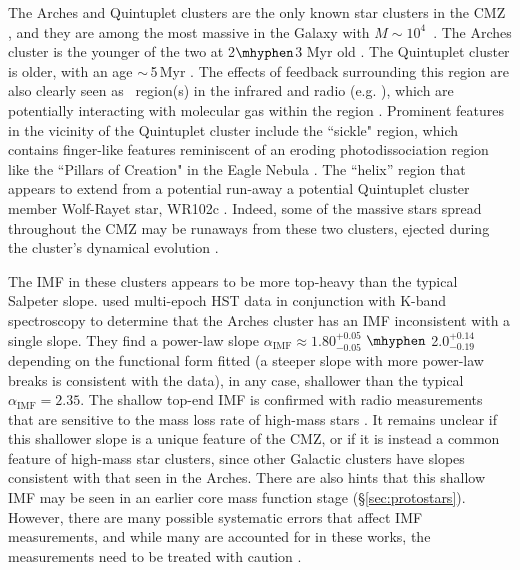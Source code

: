 The Arches and Quintuplet clusters are the only known star clusters in the CMZ
\citep[we leave out the Young Nuclear Cluster, YNC, as it is at $R<10$ pc and its formation mechanism is likely entirely different from these clusters, see e.g.][]{Genzel2010, Neumayer2020},
and they are among the most massive in the Galaxy with $M\sim10^4$~\msun.
The Arches cluster is the younger of the two at 2$\mhyphen$3 Myr old \citep{Lohr2018, Clark2019}.
The Quintuplet cluster is older, with an age $\sim$\,5\,Myr \citep{Liermann2012,Schneider2014,Rui2019}.
The effects of feedback surrounding this region are also clearly seen as \hii\ region(s) in the infrared and radio (e.g. \citealp{Lang2005,Hankins2020}), which are potentially interacting with molecular gas within the region \citep{Butterfield2018}.
Prominent features in the vicinity of the Quintuplet cluster include the ``sickle" region, which contains finger-like features reminiscent of an eroding photodissociation region like the ``Pillars of Creation" in the Eagle Nebula \citep{Hankins2020}. 
The ``helix” region that appears to extend from a potential run-away a potential Quintuplet cluster member Wolf-Rayet star, WR102c \citep{Lau2016,Steinke2016}. 
Indeed, some of the massive stars spread throughout the CMZ may be runaways from these two clusters, ejected during the cluster's dynamical evolution \citep{Habibi2014,Dong2015}.

The IMF in these clusters appears to be more top-heavy than the typical Salpeter slope.
\citet{Hosek2019} used multi-epoch HST data in conjunction with K-band spectroscopy to determine that the Arches cluster has an IMF inconsistent with a single slope.
They find a power-law slope $\alpha_\mathrm{IMF}\approx1.80^{+0.05}_{-0.05}$ $\mhyphen$ 2.0$^{+0.14}_{-0.19}$ depending on the functional form fitted (a steeper slope with more power-law breaks is consistent with the data), in any case, shallower than the typical $\alpha_\mathrm{IMF}=2.35$.
The shallow top-end IMF is confirmed with radio measurements that are sensitive to the mass loss rate of high-mass stars \citep{Gallego-Calvente2021a,Gallego-Calvente2021b}.
It remains unclear if this shallower slope is a unique feature of the CMZ, or if it is instead a common feature of high-mass star clusters, since other Galactic clusters \citep[e.g., Wd1, NGC 3603,][]{Pang2013,Lim2013,Andersen2017} have slopes consistent with that seen in the Arches.
There are also hints that this shallow IMF may be seen in an earlier core mass function stage (\S \ref{sec:protostars}).
However, there are many possible systematic errors that affect IMF measurements, and while many are accounted for in these works, the measurements need to be treated with caution \citep[e.g.][]{Bastian2010}. 

